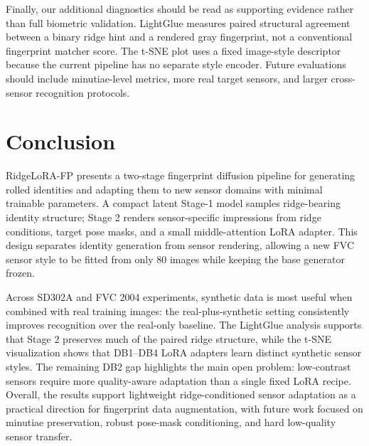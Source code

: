 \documentclass{article}
\newcommand{\method}{RidgeLoRA-FP}
\begin{document}
Finally, our additional diagnostics should be read as supporting evidence rather
than full biometric validation.  LightGlue measures paired structural agreement
between a binary ridge hint and a rendered gray fingerprint, not a conventional
fingerprint matcher score.  The t-SNE plot uses a fixed image-style descriptor
because the current pipeline has no separate style encoder.  Future evaluations
should include minutiae-level metrics, more real target sensors, and larger
cross-sensor recognition protocols.

\section{Conclusion}
\label{sec:conclusion}

\method{} presents a two-stage fingerprint diffusion pipeline for generating
rolled identities and adapting them to new sensor domains with minimal
trainable parameters.  A compact latent Stage-1 model samples ridge-bearing
identity structure; Stage 2 renders sensor-specific impressions from ridge
conditions, target pose masks, and a small middle-attention LoRA adapter.  This
design separates identity generation from sensor rendering, allowing a new FVC
sensor style to be fitted from only 80 images while keeping the base generator
frozen.

Across SD302A and FVC 2004 experiments, synthetic data is most useful when
combined with real training images: the real-plus-synthetic setting consistently
improves recognition over the real-only baseline.  The LightGlue analysis
supports that Stage 2 preserves much of the paired ridge structure, while the
t-SNE visualization shows that DB1--DB4 LoRA adapters learn distinct synthetic
sensor styles.  The remaining DB2 gap highlights the main open problem:
low-contrast sensors require more quality-aware adaptation than a single fixed
LoRA recipe.  Overall, the results support lightweight ridge-conditioned sensor
adaptation as a practical direction for fingerprint data augmentation, with
future work focused on minutiae preservation, robust pose-mask conditioning, and
hard low-quality sensor transfer.

{
    \small
    \nocite{goodfellow2014gan,ho2020ddpm,engelsma2022prints,shoshan2023fpgan}
    \nocite{li2023latentfingerprint,grabovski2024diffinger,wang2024latentfingerprint,hsu2024inpainting}
    \nocite{tang2024enhancing,rombach2022ldm,zhang2023controlnet,ye2023ipadapter}
    \nocite{hong1998fingerprint,cappelli2000synthetic,zhu2023fingergan,attaher2022hqfingan}
    \nocite{bouzaglo2022fingerprints,ugot2021biometric,mou2024t2iadapter,nist302}
    \nocite{radford2021clip,fvc2004,lindenberger2023lightglue,potje2024xfeat}
    \nocite{tabassi2021nfiq2,mittal2012niqe,he2016resnet,dosovitskiy2020vit,deng2009imagenet}
    
    
}
\end{document}
